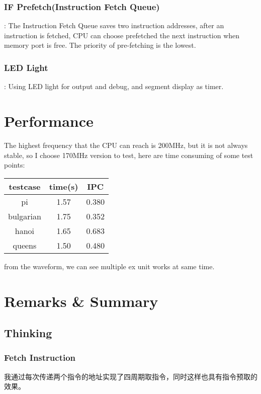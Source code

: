 \documentclass[UTF8]{ctexart}
\begin{document}
    \subsubsection{IF Prefetch(Instruction Fetch Queue)} : 
    The Instruction Fetch Queue saves two instruction addresses, after an instruction is fetched, CPU can
    choose prefetched the next instruction when memory port is free. The priority of pre-fetching is the lowest.
    \subsubsection{LED Light} : Using LED light for output and debug, and segment display as timer.
\section{Performance}
    The highest frequency that the CPU can reach is 200MHz, but it is not always 
    stable, so I choose 170MHz version to test, here are time consuming of some test points:
    \begin{center}
        \begin{tabular}{ccc}
            \hline
            testcase & time(s) & IPC \\
            \hline
            pi & 1.57  & 0.380\\
            \hline
            bulgarian & 1.75  & 0.352\\
            \hline
            hanoi & 1.65  & 0.683\\
            \hline
            queens & 1.50  & 0.480\\
            \hline
        \end{tabular}
    \end{center}
    from the waveform, we can see multiple ex unit works at same time.

\section{Remarks \& Summary}
    \subsection{Thinking}
    \subsubsection{Fetch Instruction}
    我通过每次传递两个指令的地址实现了四周期取指令，同时这样也具有指令预取的效果。
\end{document}
